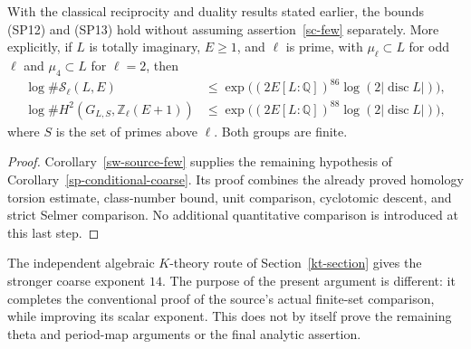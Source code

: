 \begin{corollary}\label{sw-coarse-consequence}
With the classical reciprocity and duality results
stated earlier, the bounds (SP12) and (SP13) hold
without assuming assertion~\ref{sc-few} separately.
More explicitly, if \(L\) is totally imaginary,
\(E\ge1\), and \(\ell\) is prime, with
\(\mu_\ell\subset L\) for odd \(\ell\) and
\(\mu_4\subset L\) for \(\ell=2\), then
\[
 \begin{split}
 \log\#\mathcal S_\ell(L,E)
   &\le \exp\bigl((2E[L:\mathbb Q])^{86}
                          \log(2|\operatorname{disc}L|)\bigr),\\
 \log\#H^2(G_{L,S},\mathbb Z_\ell(E+1))
   &\le \exp\bigl((2E[L:\mathbb Q])^{88}
                          \log(2|\operatorname{disc}L|)\bigr),
 \end{split}
\]
where \(S\) is the set of primes above \(\ell\).
Both groups are finite.
\end{corollary}
\begin{proof}
Corollary~\ref{sw-source-few} supplies the remaining
hypothesis of Corollary~\ref{sp-conditional-coarse}.
Its proof combines the already proved homology torsion
estimate, class-number bound, unit comparison,
cyclotomic descent, and strict Selmer comparison.
No additional quantitative comparison is introduced
at this last step.
\end{proof}

The independent algebraic \(K\)-theory route of
Section~\ref{kt-section} gives the stronger coarse
exponent \(14\).  The purpose of the present argument
is different: it completes the conventional proof of
the source's actual finite-set comparison, while
improving its scalar exponent.  This does not by
itself prove the remaining theta and period-map
arguments or the final analytic assertion.


